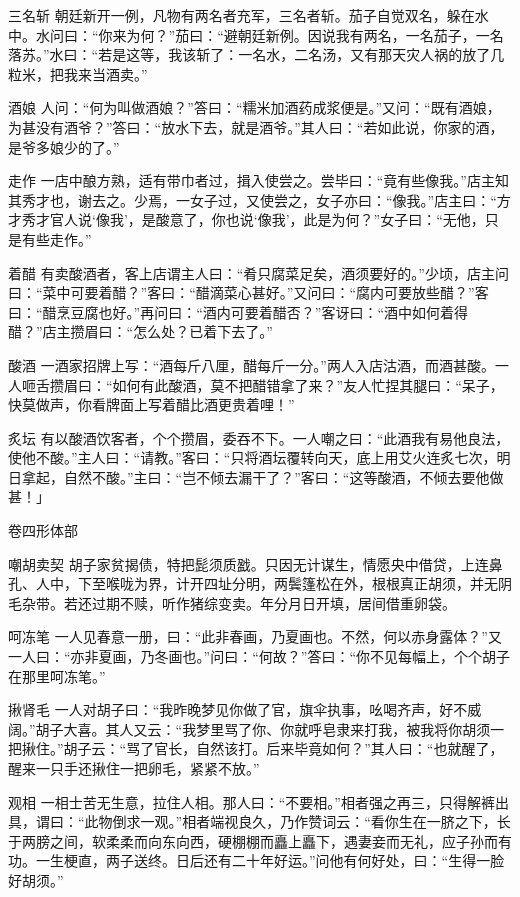 \documentclass[12pt,UTF8]{ctexbook}
\begin{document}
三名斩
朝廷新开一例，凡物有两名者充军，三名者斩。茄子自觉双名，躲在水中。水问曰：“你来为何？”茄曰：“避朝廷新例。因说我有两名，一名茄子，一名落苏。”水曰：“若是这等，我该斩了：一名水，二名汤，又有那天灾人祸的放了几粒米，把我来当酒卖。”

酒娘
人问：“何为叫做酒娘？”答曰：“糯米加酒药成浆便是。”又问：“既有酒娘，为甚没有酒爷？”答曰：“放水下去，就是酒爷。”其人曰：“若如此说，你家的酒，是爷多娘少的了。”

走作
一店中酿方熟，适有带巾者过，揖入使尝之。尝毕曰：“竟有些像我。”店主知其秀才也，谢去之。少焉，一女子过，又使尝之，女子亦曰：“像我。”店主曰：“方才秀才官人说‘像我’，是酸意了，你也说‘像我’，此是为何？”女子曰：“无他，只是有些走作。”

着醋
有卖酸酒者，客上店谓主人曰：“肴只腐菜足矣，酒须要好的。”少顷，店主问曰：“菜中可要着醋？”客曰：“醋滴菜心甚好。”又问曰：“腐内可要放些醋？”客曰：“醋烹豆腐也好。”再问曰：“酒内可要着醋否？”客讶曰：“酒中如何着得醋？”店主攒眉曰：“怎么处？已着下去了。”

酸酒
一酒家招牌上写：“酒每斤八厘，醋每斤一分。”两人入店沽酒，而酒甚酸。一人咂舌攒眉曰：“如何有此酸酒，莫不把醋错拿了来？”友人忙捏其腿曰：“呆子，快莫做声，你看牌面上写着醋比酒更贵着哩！”

炙坛
有以酸酒饮客者，个个攒眉，委吞不下。一人嘲之曰：“此酒我有易他良法，使他不酸。”主人曰：“请教。”客曰：“只将酒坛覆转向天，底上用艾火连炙七次，明日拿起，自然不酸。”主曰：“岂不倾去漏干了？”客曰：“这等酸酒，不倾去要他做甚！」

卷四形体部

嘲胡卖契
胡子家贫揭债，特把髭须质戤。只因无计谋生，情愿央中借贷，上连鼻孔、人中，下至喉咙为界，计开四址分明，两鬓篷松在外，根根真正胡须，并无阴毛杂带。若还过期不赎，听作猪综变卖。年分月日开填，居间借重卵袋。

呵冻笔
一人见春意一册，曰：“此非春画，乃夏画也。不然，何以赤身露体？”又一人曰：“亦非夏画，乃冬画也。”问曰：“何故？”答曰：“你不见每幅上，个个胡子在那里呵冻笔。”

揪肾毛
一人对胡子曰：“我昨晚梦见你做了官，旗伞执事，吆喝齐声，好不威阔。”胡子大喜。其人又云：“我梦里骂了你、你就呼皂隶来打我，被我将你胡须一把揪住。”胡子云：“骂了官长，自然该打。后来毕竟如何？”其人曰：“也就醒了，醒来一只手还揪住一把卵毛，紧紧不放。”

观相
一相士苦无生意，拉住人相。那人曰：“不要相。”相者强之再三，只得解裤出具，谓曰：“此物倒求一观。”相者端视良久，乃作赞词云：“看你生在一脐之下，长于两膀之间，软柔柔而向东向西，硬棚棚而矗上矗下，遇妻妾而无礼，应子孙而有功。一生梗直，两子送终。日后还有二十年好运。”问他有何好处，曰：“生得一脸好胡须。”
\end{document}

